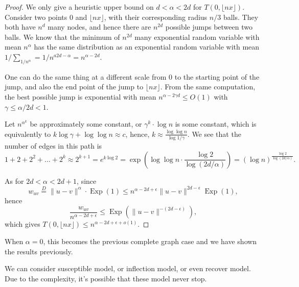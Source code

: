 \begin{proof}
	We only give a heuristic upper bound on \(d < \alpha < 2d\) for \(T(0, \lfloor n x \rfloor )\). Consider two points \(0\) and \(\lfloor nx \rfloor \), with their corresponding radius \(n / 3\) balls. They both have \(n^d\) many nodes, and hence there are \(n^{2d} \) possible jumps between two balls. We know that the minimum of \(n^{2d}\) many exponential random variable with mean \(n^{\alpha }\) has the same distribution as an exponential random variable with mean \(1 / \sum_{1 / n^\alpha } = 1 / n^{a2d - \alpha } = n^{\alpha - 2d}\).

	One can do the same thing at a different scale from \(0\) to the starting point of the jump, and also the end point of the jump to \(\lfloor nx \rfloor \). From the same computation, the best possible jump is exponential with mean \(n^{\alpha - 2\gamma d} \leq O(1)\) with \(\gamma \leq \alpha / 2d < 1\).

	\begin{center}
	\end{center}

	Let \(n^{\alpha ^k} \) be approximately some constant, or \(\gamma ^k \cdot \log n\) is some constant, which is equivalently to \(k \log \gamma + \log \log n \approx c\), hence, \(k \approx \frac{\log \log n}{\log 1 / \gamma }\). We see that the number of edges in this path is
	\[
		1 + 2 + 2^2 + \dots + 2^k
		\approx 2^{k+1}
		= e^{k \log 2}
		= \exp (\log \log n \cdot \frac{\log 2}{\log (2d / \alpha )})
		= (\log n)^{\frac{\log 2}{\log (2d / \alpha )}}.
	\]

	As for \(2d < \alpha < 2d + 1\), since
	\[
		w_{uv} \overset{D}{=} \lVert u - v \rVert ^{\alpha } \cdot \operatorname{Exp}(1)
		\leq n^{\alpha - 2d + \epsilon } \lVert u - v \rVert ^{2d - \epsilon } \operatorname{Exp}(1),
	\]
	hence
	\[
		\frac{w_{uv}}{n^{\alpha - 2d + \epsilon }}
		\leq \operatorname{Exp}(\lVert u - v \rVert ^{- (2d - \epsilon )}),
	\]
	which gives \(T(0, \lfloor n x \rfloor ) \leq n^{\alpha - 2d + \epsilon + o(1)}\).
\end{proof}

\begin{remark}
	When \(\alpha = 0\), this becomes the previous complete graph case and we have shown the results previously.
\end{remark}

We can consider susceptible model, or inflection model, or even recover model. Due to the complexity, it's possible that these model never stop.

